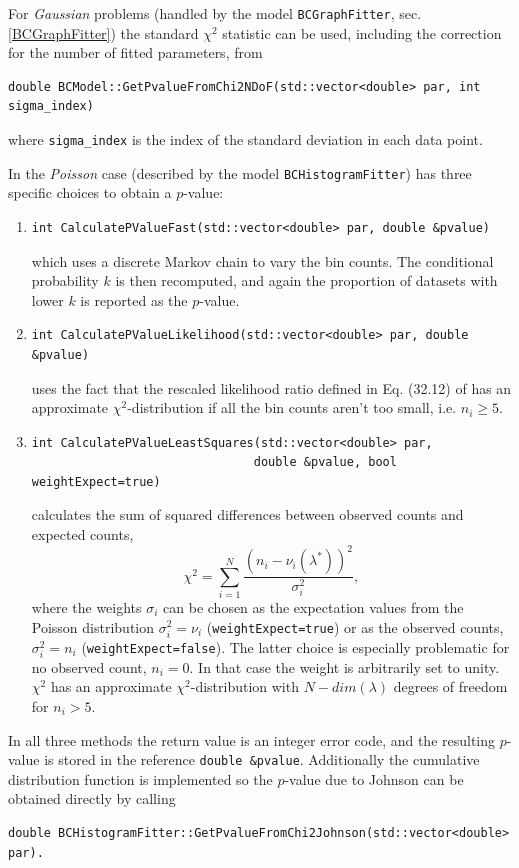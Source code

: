 \documentclass[11pt, a4paper]{article}
\begin{document}
For \textit{Gaussian} problems (handled by the model \verb|BCGraphFitter|, sec. \ref{BCGraphFitter})
 the standard $\chi^2$ statistic can be used, 
including the correction for the number of fitted parameters, from 
\begin{verbatim}
double BCModel::GetPvalueFromChi2NDoF(std::vector<double> par, int sigma_index)
\end{verbatim}
where \verb|sigma_index| is the index of the standard deviation in each
data point. 

In the \textit{Poisson} case (described by the model \verb|BCHistogramFitter|) has three
specific choices to obtain a $p$-value: 
\begin{enumerate}
 \item 
\begin{verbatim}
int CalculatePValueFast(std::vector<double> par, double &pvalue)
\end{verbatim}
which uses a discrete Markov chain to vary the bin counts. 
The conditional probability $k$ is then recomputed, and
again the proportion of datasets with lower $k$ is
reported as the $p$-value. 
\item
\begin{verbatim}
int CalculatePValueLikelihood(std::vector<double> par, double &pvalue)
\end{verbatim}
uses the fact that the rescaled likelihood ratio defined in Eq. (32.12)
of \cite{PDGstatistics} has an approximate $\chi^2$-distribution 
if all the bin counts aren't too small, i.e. $n_i \ge 5$. 

\item
\begin{verbatim}
int CalculatePValueLeastSquares(std::vector<double> par,
                               double &pvalue, bool weightExpect=true)
\end{verbatim}
calculates the sum of squared differences between observed counts 
and expected counts, 
$$\chi^2 = \sum_{i=1}^N \frac{\left(n_i - \nu_i(\lambda^{*})\right)^2}{\sigma_i^2},$$ 
where the weights $\sigma_i$ can be chosen as the 
expectation values from the Poisson distribution $\sigma_i^2 = \nu_i$
(\verb|weightExpect=true|) or as the observed counts, $\sigma_i^2 = n_i$
(\verb|weightExpect=false|).
The latter choice is especially problematic for no observed count,
$n_i =0$. In that case the weight is arbitrarily set to unity. 
$\chi^2$ has an approximate $\chi^2$-distribution 
with $N-dim(\lambda)$ degrees of freedom for $n_i>5$.
\end{enumerate}
In all three methods the return value is an integer error code, and the resulting 
$p$-value is stored in the reference  \verb|double &pvalue|.
Additionally the cumulative distribution function is 
implemented so the $p$-value due to Johnson \cite{Johnson_pValue} 
can be obtained directly by calling
\begin{verbatim}
double BCHistogramFitter::GetPvalueFromChi2Johnson(std::vector<double> par).
\end{verbatim}
\end{document}
